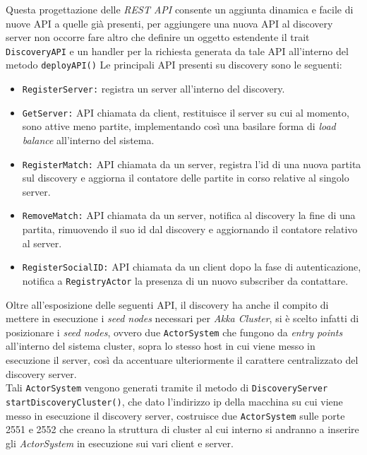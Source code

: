 Questa progettazione delle \textit{REST API} consente un aggiunta dinamica e facile di nuove API a quelle già presenti, per aggiungere una nuova API al discovery server non occorre fare altro che definire un oggetto estendente il trait \texttt{DiscoveryAPI} e un handler per la richiesta generata da tale API all'interno del metodo \texttt{deployAPI()}
Le principali API presenti su discovery sono le seguenti:

\begin{itemize}
  \item{\texttt{RegisterServer:}} registra un server all'interno del discovery.

  \item{\texttt{GetServer:}} API chiamata da client, restituisce il server su cui al momento, sono attive meno partite, implementando così una basilare forma di \textit{load balance} all'interno del sistema.

  \item{\texttt{RegisterMatch:}} API chiamata da un server, registra l'id di una nuova partita sul discovery e aggiorna il contatore delle partite in corso relative al singolo server.

  \item{\texttt{RemoveMatch:}} API chiamata da un server, notifica al discovery la fine di una partita, rimuovendo il suo id dal discovery e aggiornando il contatore relativo al server.

  \item{\texttt{RegisterSocialID:}} API chiamata da un client dopo la fase di autenticazione, notifica a \texttt{RegistryActor} la presenza di un nuovo subscriber da contattare.
\end{itemize}

Oltre all'esposizione delle seguenti API, il discovery ha anche il compito di mettere in esecuzione i \textit{seed nodes} necessari per \textit{Akka Cluster}, si è scelto infatti di posizionare i \textit{seed nodes}, ovvero due \texttt{ActorSystem} che fungono da \textit{entry points} all'interno del sistema cluster, sopra lo stesso host in cui viene messo in esecuzione il server, così da accentuare ulteriormente il carattere centralizzato del discovery server.\\
 Tali \texttt{ActorSystem} vengono generati tramite il metodo di \texttt{DiscoveryServer} \texttt{startDiscoveryCluster()}, che dato l'indirizzo ip della macchina su cui viene messo in esecuzione il discovery server, costruisce due \texttt{ActorSystem} sulle porte 2551 e 2552 che creano la struttura di cluster al cui interno si andranno a inserire gli \textit{ActorSystem} in esecuzione sui vari client e server.

